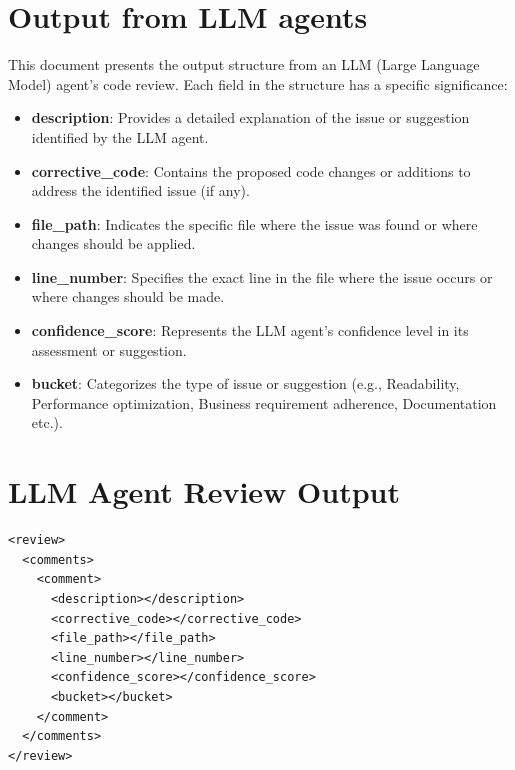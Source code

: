 \onecolumn

\appendix

\begin{appendices}

\section{Output from LLM agents}
\label{app:agent_output_schema}
This document presents the output structure from an LLM (Large Language Model) agent's code review. Each field in the structure has a specific significance:

\begin{itemize}
    \item \textbf{description}: Provides a detailed explanation of the issue or suggestion identified by the LLM agent.
    \item \textbf{corrective\_code}: Contains the proposed code changes or additions to address the identified issue (if any).
    \item \textbf{file\_path}: Indicates the specific file where the issue was found or where changes should be applied.
    \item \textbf{line\_number}: Specifies the exact line in the file where the issue occurs or where changes should be made.
    \item \textbf{confidence\_score}: Represents the LLM agent's confidence level in its assessment or suggestion.
    \item \textbf{bucket}: Categorizes the type of issue or suggestion (e.g., Readability, Performance optimization, Business requirement adherence, Documentation etc.).
\end{itemize}

\section*{LLM Agent Review Output}

\begin{lstlisting}[style=XMLStyle]
<review>
  <comments>
    <comment>
      <description></description>
      <corrective_code></corrective_code>
      <file_path></file_path>
      <line_number></line_number>
      <confidence_score></confidence_score>
      <bucket></bucket>
    </comment>
  </comments>
</review>
\end{lstlisting}




\end{appendices}
